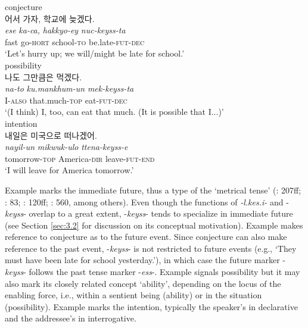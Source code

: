 \documentclass[output=paper,colorlinks,citecolor=brown]{langscibook}
\begin{document}
\ex conjecture\\ \label{ex:rhee:9b}
\textkorean{어서 가자, 학교에 늦겠다}.\\
    \gll \textit{ese} \textit{ka-ca,} \textit{hakkyo-ey} \textit{nuc-keyss-ta}\\
         fast go-\textsc{hort} school-\textsc{to} be.late-\textsc{fut-dec}\\
    \glt ‘Let’s hurry up; we will/might be late for school.’\\


\ex possibility\\ \label{ex:rhee:9c}
\textkorean{나도 그만큼은 먹겠다}.\\
    \gll \textit{na-to} \textit{ku.mankhum-un} \textit{mek-keyss-ta}\\
         I-\textsc{also} that.much-\textsc{top} eat-\textsc{fut-dec}\\
    \glt ‘(I think) I, too, can eat that much. (It is possible that I...)’\\


\ex intention\\ \label{ex:rhee:9d}
\textkorean{내일은 미국으로 떠나겠어}.\\
    \gll \textit{nayil-un} \textit{mikwuk-ulo} \textit{ttena-keyss-e}\\
         tomorrow-\textsc{top} America-\textsc{dir} leave-\textsc{fut-end}\\
    \glt ‘I will leave for America tomorrow.’\\
    \z
\z

Example  marks the immediate future, thus a type of the ‘metrical tense’ (\cite{ChungTimberlake1985}: 207ff; \cite{Comrie1985}: 83; \cite{Dahl1985}: 120ff; \cite{Binnick2001}: 560, among others). Even though the functions of \textit{-l.kes.i-} and -\textit{keyss}- overlap to a great extent, -\textit{keyss}- tends to specialize in immediate future (see Section \ref{sec:3.2} for discussion on its conceptual motivation). Example  makes reference to conjecture as to the future event. Since conjecture can also make reference to the past event, -\textit{keyss}- is not restricted to future events (e.g., ‘They must have been late for school yesterday.’), in which case the future marker -\textit{keyss}- follows the past tense marker -\textit{ess}-. Example  signals possibility but it may also mark its closely related concept ‘ability’, depending on the locus of the enabling force, i.e., within a sentient being (ability) or in the situation (possibility). Example  marks the intention, typically the speaker’s in declarative and the addressee’s in interrogative. 
\end{document}
